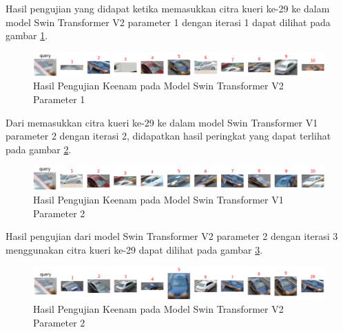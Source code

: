 Hasil pengujian yang didapat ketika memasukkan citra kueri ke-29 ke dalam model Swin Transformer V2 parameter 1 dengan 
iterasi 1 dapat dilihat pada gambar \ref{fig:hasilpengujiankeenampadamodelswintransformerv2param1}.

\begin{figure}[h!]
  \centering
  \includegraphics[scale=0.6]{gambar/Que29V2P1IT1.png}
  \caption{Hasil Pengujian Keenam pada Model Swin Transformer V2 Parameter 1}
  \label{fig:hasilpengujiankeenampadamodelswintransformerv2param1}
\end{figure}

Dari memasukkan citra kueri ke-29 ke dalam model Swin Transformer V1 parameter 2 dengan iterasi 2, didapatkan hasil 
peringkat yang dapat terlihat pada gambar \ref{fig:hasilpengujiankeenampadamodelswintransformerv1param2}.

\begin{figure}[h!]
  \centering
  \includegraphics[scale=0.6]{gambar/Que29V1P2IT2.png}
  \caption{Hasil Pengujian Keenam pada Model Swin Transformer V1 Parameter 2}
  \label{fig:hasilpengujiankeenampadamodelswintransformerv1param2}
\end{figure}

Hasil pengujian dari model Swin Transformer V2 parameter 2 dengan iterasi 3 menggunakan citra kueri ke-29 dapat 
dilihat pada gambar \ref{fig:hasilpengujiankeenampadamodelswintransformerv2param2}.

\begin{figure}[h!]
  \centering
  \includegraphics[scale=0.6]{gambar/Que29V2P2IT3.png}
  \caption{Hasil Pengujian Keenam pada Model Swin Transformer V2 Parameter 2}
  \label{fig:hasilpengujiankeenampadamodelswintransformerv2param2}
\end{figure}

